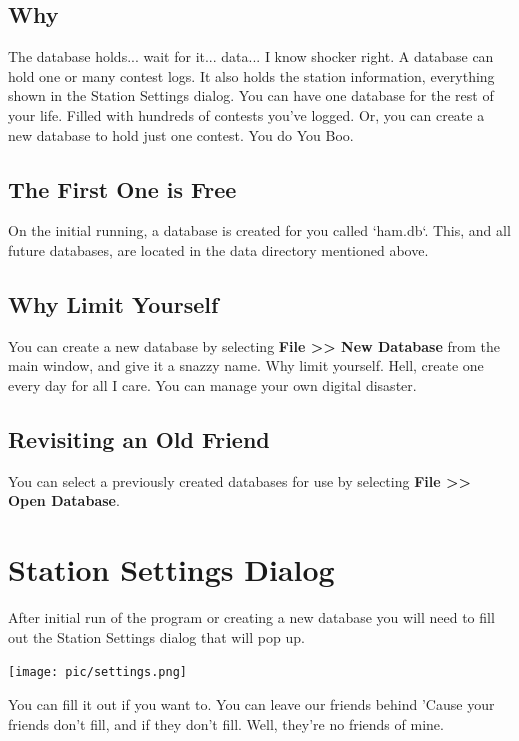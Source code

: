 \documentclass{article}
\begin{document}
\subsection{Why}

The database holds... wait for it... data... I know shocker right. A database can hold one or many contest logs. It also holds the station information, everything shown in the Station Settings dialog. You can have one database for the rest of your life. Filled with hundreds of contests you've logged. Or, you can create a new database to hold just one contest. You do You Boo.

\subsection{The First One is Free}

On the initial running, a database is created for you called `ham.db`. This, and all future databases, are located in the data directory mentioned above.

\subsection{Why Limit Yourself}

You can create a new database by selecting \textbf{File >> New Database} from the main window, and give it a snazzy name. Why limit yourself. Hell, create one every day for all I care. You can manage your own digital disaster.

\subsection{Revisiting an Old Friend}

You can select a previously created databases for use by selecting
\textbf{File >> Open Database}.
\newpage
\section{Station Settings Dialog}

After initial run of the program or creating a new database you will need to fill out the Station Settings dialog that will pop up.

\vspace{0.5cm}
\texttt{[image: pic/settings.png]}
\vspace{0.5cm}

You can fill it out if you want to. You can leave our friends behind 'Cause your friends don't fill, and if they don't fill. Well, they're no friends of mine.
\end{document}
